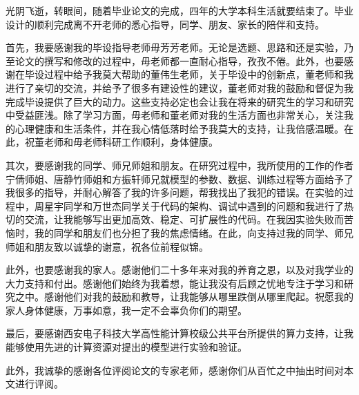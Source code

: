 光阴飞逝，转眼间，随着毕业论文的完成，四年的大学本科生活就要结束了。毕业设计的顺利完成离不开老师的悉心指导，同学、朋友、家长的陪伴和支持。

首先，我要感谢我的毕设指导老师毋芳芳老师。无论是选题、思路和还是实验，乃至论文的撰写和修改的过程中，毋老师都一直耐心指导，孜孜不倦。此外，也要感谢在毕设过程中给予我莫大帮助的董伟生老师，关于毕设中的创新点，董老师和我进行了亲切的交流，并给予了很多有建设性的建议，董老师对我的鼓励和督促为我完成毕设提供了巨大的动力。这些支持必定也会让我在将来的研究生的学习和研究中受益匪浅。除了学习方面，毋老师和董老师对我的生活方面也非常关心，关注我的心理健康和生活条件，并在我心情低落时给予我莫大的支持，让我倍感温暖。在此，祝董老师和毋老师科研工作顺利，身体健康。

其次，要感谢我的同学、师兄师姐和朋友。在研究过程中，我所使用的工作的作者宁倩师姐、唐静竹师姐和方振轩师兄就模型的参数、数据、训练过程等方面给予了我很多的指导，并耐心解答了我的许多问题，帮我找出了我犯的错误。在实验的过程中，周星宇同学和万世杰同学关于代码的架构、调试中遇到的问题和我进行了热切的交流，让我能够写出更加高效、稳定、可扩展性的代码。在我因实验失败而苦恼时，我的同学和朋友们也分担了我的焦虑情绪。在此，向支持过我的同学、师兄师姐和朋友致以诚挚的谢意，祝各位前程似锦。

此外，也要感谢我的家人。感谢他们二十多年来对我的养育之恩，以及对我学业的大力支持和付出。感谢他们始终为我着想，能让我没有后顾之忧地专注于学习和研究之中。感谢他们对我的鼓励和教导，让我能够从哪里跌倒从哪里爬起。祝愿我的家人身体健康，万事如意，我一定不会辜负你们的期望。

最后，要感谢西安电子科技大学高性能计算校级公共平台所提供的算力支持，让我能够使用先进的计算资源对提出的模型进行实验和验证。

此外，我诚挚的感谢各位评阅论文的专家老师，感谢你们从百忙之中抽出时间对本文进行评阅。